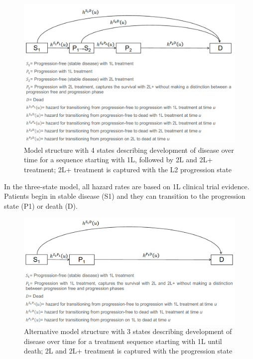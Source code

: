 \documentclass[11pt,final,fleqn]{article}\usepackage[]{graphicx}\usepackage[]{color}
\theoremstyle{plain}
\begin{document}
{\begin{figure}
\centering
\includegraphics[scale = .7]{figs/model-structure-4-states.png}
\caption{Model structure with 4 states describing development of disease over time for a sequence starting with 1L, followed by 2L and 2L+ treatment; 2L+ treatment is captured with the L2 progression state}\label{fig:model-structure-4-states}
\end{figure}

In the three-state model, all hazard rates are based on 1L clinical trial evidence. Patients begin in stable disease (S1) and they can transition to the progression state (P1) or death (D).

\begin{figure}
\centering
\includegraphics[scale = .7]{figs/model-structure-3-states.png}
\caption{Alternative model structure with 3 states describing development of disease over time for a treatment sequence starting with 1L until death; 2L and 2L+ treatment is captured with the progression state}\label{fig:model-structure-3-states} 
\end{figure}

}
\end{document}
